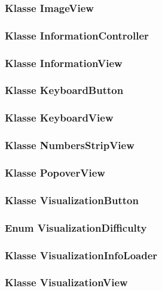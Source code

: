 \documentclass{article}
\begin{document}
	\subsubsection{Klasse ImageView}

	\subsubsection{Klasse InformationController}

	\subsubsection{Klasse InformationView}

	\subsubsection{Klasse KeyboardButton}

	\subsubsection{Klasse KeyboardView}

	\subsubsection{Klasse NumbersStripView}

	\subsubsection{Klasse PopoverView}

	\subsubsection{Klasse VisualizationButton}

	\subsubsection{Enum VisualizationDifficulty}

	\subsubsection{Klasse VisualizationInfoLoader}

	\subsubsection{Klasse VisualizationView}
\end{document}
